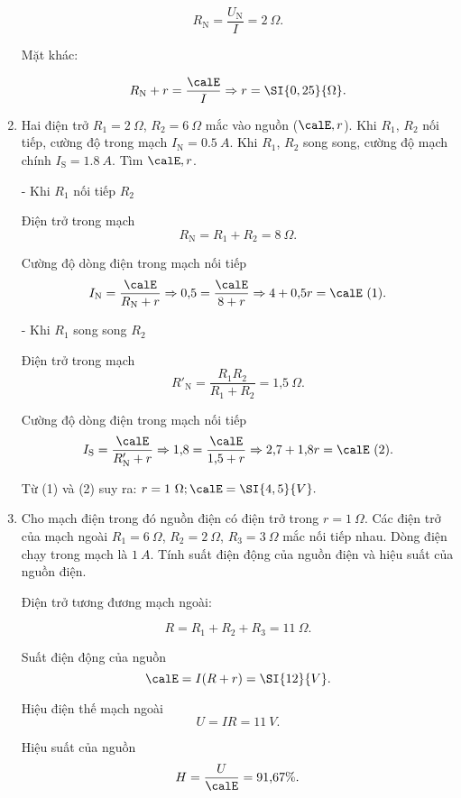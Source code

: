 \begin{enumerate}[label=\bfseries Câu \arabic*:]
{			$$R_\text{N} = \dfrac{U_\text{N}}{I} = \SI{2}{\Omega}.$$
			
			Mặt khác:
			
			$$R_\text{N} +r = \dfrac{\calE}{I} \Rightarrow r = \SI{0,25}{\Omega}.$$
			
		}
		\item {}
		
		
		{
		Hai điện trở $R_1 = 2\ \Omega$, $R_2 = 6\ \Omega$ mắc vào nguồn ($\calE, r$). Khi $R_1$, $R_2$ nối tiếp, cường độ trong mạch $I_\text{N} = \SI{0,5}{A}$. Khi $R_1$, $R_2$ song song, cường độ mạch chính $I_\text{S} = \SI{1,8}{A}$. Tìm $\calE, r$.
		}
		
		\hideall
		{		
			- Khi $R_1$ nối tiếp $R_2$ 
			
			Điện trở trong mạch
			$$R_\text{N} = R_1 +R_2 =8\ \Omega.$$
			
			Cường độ dòng điện trong mạch nối tiếp
			$$I_\text{N} =\dfrac{\calE}{R_\text{N}+r}\Rightarrow \text{0,5} =\dfrac{\calE}{8+r}\Rightarrow 4+\text{0,5}r =\calE\ (1).$$
			
			- Khi $R_1$ song song $R_2$ 
			
			Điện trở trong mạch
			$$R'_\text{N} = \dfrac{R_1R_2}{R_1+R_2} =\text{1,5}\ \Omega.$$
			
			Cường độ dòng điện trong mạch nối tiếp
			$$I_\text{S} =\dfrac{\calE}{R'_\text{N}+r}\Rightarrow \text{1,8} =\dfrac{\calE}{\text{1,5}+r}\Rightarrow \text{2,7}+\text{1,8}r =\calE \ (2).$$	
			
			Từ (1) và (2) suy ra: $r=1\ \Omega; \calE = \SI{4,5}{V}.$
	
			
		}
		\item {}
		
		
		{
			Cho mạch điện trong đó nguồn điện có điện trở trong $r = 1\ \Omega$. Các điện trở của mạch ngoài $R_1 = 6\ \Omega$, $R_2 = 2\ \Omega$, $R_3 = 3\ \Omega$ mắc nối tiếp nhau. Dòng điện chạy trong mạch là $\SI{1}{A}$. Tính suất điện động của nguồn điện và hiệu suất của nguồn điện.
		}
		
		\hideall
		{		
			
			Điện trở tương đương mạch ngoài: 
			
			$$R = R_1 + R_2 + R_3 = 11\ \Omega.$$
			
			Suất điện động của nguồn
			$$\calE  = I(R+r) =\SI{12}{V}.$$
			
			Hiệu điện thế mạch ngoài
			$$U = IR =\SI{11}{V}.$$ 
			
			Hiệu suất của nguồn
			$$H =\dfrac{U}{\calE} = \text{91,67}\%.$$
			
		}
\end{enumerate}